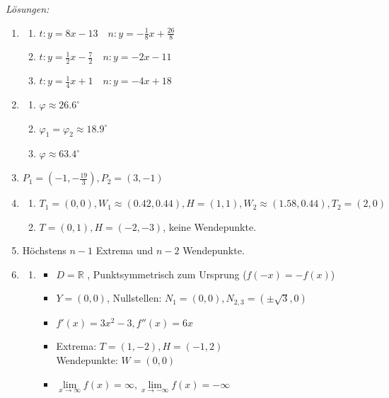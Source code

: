 \clearpage
\emph{Lösungen:}
\begin{enumerate}
    \item \begin{enumerate}
        \item $t: y=8x-13 \quad n: y= -\frac{1}{8}x +\frac{26}{8}$
        \item $t: y=\frac{1}{2}x-\frac{7}{2} \quad n: y= -2x -11$
        \item $t: y=\frac{1}{4}x+1 \quad n: y= -4x +18$
    \end{enumerate}
    \item \begin{enumerate}
        \item $\varphi\approx 26.6^\circ$
        \item $\varphi_1=\varphi_2\approx 18.9^\circ$
        \item $\varphi\approx 63.4^\circ$
    \end{enumerate}
    \item $P_1 =\left(-1, -\frac{19}{3}\right), P_2 = (3,-1 )$
    \item \begin{enumerate}
        \item $T_1 = (0,0), W_1 \approx(0.42, 0.44) , H =(1,1), W_2\approx(1.58, 0.44), T_2=(2,0)$
        \item $T=(0, 1), H = (-2, -3)$, keine Wendepunkte. 
    \end{enumerate}
    \item Höchstens $n-1$ Extrema und $n-2$ Wendepunkte.
    \item \begin{enumerate}
                \item \begin{itemize}
                    \item $D = \mathbb{R}$ , Punktsymmetrisch zum Ursprung ($f(-x) = -f(x)$)
                    \item $Y = (0, 0)$, Nullstellen: $N_1 = (0,0), N_{2,3} = (\pm \sqrt{3}, 0)$
                    \item $f'(x) =3x^2-3, f''(x) = 6x$
                    \item Extrema: $T=(1,-2), H=(-1, 2)$ \\
                        Wendepunkte: $W = (0, 0)$
                    \item $\lim\limits_{x \to \infty} f(x) = \infty, \lim\limits_{x \to -\infty} f(x) = -\infty$
                    \end{itemize}

\end{enumerate}
\end{enumerate}
